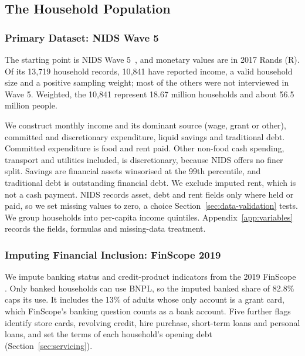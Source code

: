 \subsection{The Household Population}
\label{sec:population}

\subsubsection*{Primary Dataset: NIDS Wave 5}
\label{sec:backbone}

The starting point is \ac{NIDS} Wave 5~\citep{nids_w5_2018}, and monetary values are in
2017 Rands (R). Of its 13{,}719 household records, 10{,}841 have reported income, a valid
household size and a positive sampling weight; most of the others were not interviewed in
Wave 5. Weighted, the 10{,}841 represent 18.67 million households and about 56.5 million people.

We construct monthly income and its dominant source (wage, grant or other), committed and
discretionary expenditure, liquid savings and traditional debt. Committed expenditure is food
and rent paid. Other non-food cash spending, transport and utilities included, is discretionary,
because \ac{NIDS} offers no finer split. Savings are financial assets winsorised at the 99th
percentile, and traditional debt is outstanding financial debt. We exclude imputed rent, which is
not a cash payment. \ac{NIDS} records asset, debt and rent fields only where held or paid, so we
set missing values to zero, a choice Section~\ref{sec:data-validation} tests. We group households
into per-capita income quintiles. Appendix~\ref{app:variables} records the fields, formulas and
missing-data treatment.

\subsubsection*{Imputing Financial Inclusion: FinScope 2019}
\label{sec:match}

We impute banking status and credit-product indicators from the 2019 \ac{FinScope}
\citep{finscope2019}. Only banked households can use \ac{BNPL}, so the imputed banked
share of 82.8\% caps its use. It includes the 13\% of adults whose only account is a
grant card, which \ac{FinScope}'s banking question counts as a bank account. Five further flags identify store cards,
revolving credit, hire purchase, short-term loans and personal loans, and set the terms of
each household's opening debt (Section~\ref{sec:servicing}).

